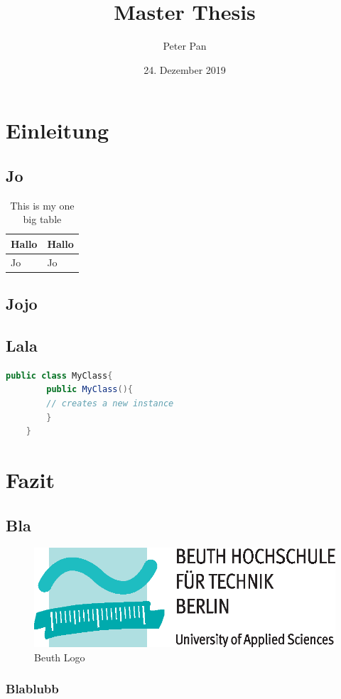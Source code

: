 \documentclass{bht-thesis}
\title{Master Thesis}
\author{Peter Pan}
\date{24. Dezember 2019}
\begin{document}
\cleardoublepage
{}
\maketitle
\tableofcontents
\listoffigures
\listoftables
\lstlistoflistings
\cleardoublepage

\onehalfspacing
{}

\chapter{Einleitung}
\section{Jo}
\blindtext[4]

\blindtext[2]
\begin{table}
	\centering
	\begin{tabular}{|l|l|}
		\hline
		Hallo & Hallo \\
		\hline
		Jo & Jo \\
		\hline
	\end{tabular}
	\caption{This is my one big table} \label{tab:sometab}
	\end{table}
\blindtext[3]
\section{Jojo}
\blindtext[2]

\blindtext[3]

\blindtext[5]

\blindtext[1]

\section{Lala}
\blindtext[3]
\begin{lstlisting}[language=Java,float,caption={Nice Java class},label={lst:class}]
	public class MyClass{
		public MyClass(){
		// creates a new instance
		}
	}
\end{lstlisting}
\blindtext[4]
\blindtext[2]
\chapter{Fazit}
\section{Bla}
\blindtext[1]
\begin{figure}
	\includegraphics{figures/Beuth-Logo_basis}
	\centering
	\caption{Beuth Logo}
	\label{fig:bht-logo}
\end{figure}
\blindtext[3]
\blindtext[5]
\subsection{Blablubb}
\blindtext[4]
\blindtext[2]
\blindtext[3]
\end{document}
